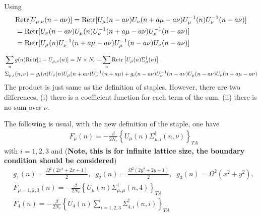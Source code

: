 Using
\begin{equation}
\begin{split}
&{\rm Retr}[U_{\mu,\nu}(n-a\nu)]={\rm Retr}[U_{\mu}(n-a\nu)U_{\nu}(n+a\mu-a\nu)U^{-1}_{\mu}(n)U^{-1}_{\nu}(n-a\nu)]\\
&={\rm Retr}[U_{\nu}(n-a\nu)U_{\mu}(n)U^{-1}_{\nu}(n+a\mu-a\nu)U^{-1}_{\mu}(n-a\nu)]\\
&={\rm Retr}[U_{\mu}(n)U^{-1}_{\nu}(n+a\mu-a\nu)U^{-1}_{\mu}(n-a\nu)U_{\nu}(n-a\nu)]\\
\end{split}
\end{equation}

\begin{equation}
\begin{split}
&\sum _ng(n){\rm Retr}[1-U_{\mu,\nu}(n)]=N\times N_c-\sum _n {\rm Retr}\left[U_{\mu}(n)\Sigma ^{\dagger}_{\mu}(n)\right]\\
&\Sigma _{\mu,i}(n,\nu)=g_i(n)U_{\nu}(n)U_{\mu}(n+a\nu)U^{-1}_{\nu}(n+a\mu)+g_i(n-a\nu)U^{-1}_{\nu}(n-a\nu)U_{\mu}(n-a\nu)U_{\nu}(n+a\mu-a\nu)\\
\end{split}
\end{equation}
The product is just same as the definition of staples. However, there are two differences, (i) there is a coefficient function for each term of the sum. (ii) there is no sum over $\nu$.

The following is usual, with the new definition of the staple, one have
\begin{equation}
\begin{split}
&F_{\mu}(n)=-\frac{\beta}{2N_c}\left\{U_{\mu}(n)\Sigma _{\mu,i}^{\dagger}(n,\nu)\right\}_{TA}
\end{split}
\end{equation}
with $i=1,2,3$ and (\textbf{Note, this is for infinite lattice size, the boundary condition should be considered})
\begin{equation}
\begin{split}
&g_1(n)=\frac{\Omega^2(2x^2+2x+1)}{2},\;\;g_2(n)=\frac{\Omega ^2 (2y^2+2y+1)}{2},\;\;g_3(n)=\Omega ^2 (x^2+y^2),\\
&F_{\mu=1,2,3}(n)=-\frac{\beta}{2N_c}\left\{U_{\mu}(n)\Sigma _{\mu,\mu}^{\dagger}(n,4)\right\}_{TA}\\
&F_{4}(n)=-\frac{\beta}{2N_c}\left\{U_{4}(n)\sum _{i=1,2,3}\Sigma _{4,i}^{\dagger}(n,i)\right\}_{TA}\\
\end{split}
\end{equation}

